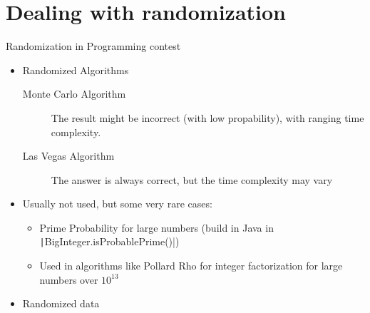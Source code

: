 \documentclass[11pt,pdf, aspectratio=169]{beamer}
\begin{document}
  \section{Dealing with randomization}
  \begin{frame}{Randomization in Programming contest}
    \begin{itemize}
      \item Randomized Algorithms
      \begin{description}
        \item[Monte Carlo Algorithm]  The result might be incorrect (with low propability), with ranging time complexity.
        \item[Las Vegas Algorithm] The answer is always correct, but the time complexity may vary
      \end{description}
      \item Usually not used, but some very rare cases:
      \begin{itemize}
        \item Prime Probability for large numbers (build in Java in \texttt|BigInteger.isProbablePrime()|)
        \item Used in algorithms like Pollard Rho for integer factorization for large numbers over $10^{13}$
      \end{itemize}
      \item Randomized data
    \end{itemize}
  \end{frame}
\end{document}
